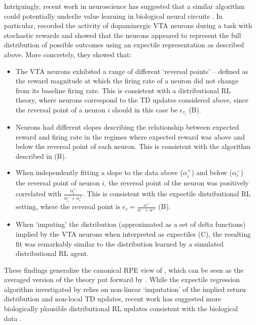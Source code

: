 Intriguingly, recent work in neuroscience has suggested that a similar algorithm could potentially underlie value learning in biological neural circuits \citep{dabney2020distributional,lowet2020distributional}.
In particular, \citet{dabney2020distributional} recorded the activity of dopaminergic VTA neurons during a task with stochastic rewards and showed that the neurons appeared to represent the full distribution of possible outcomes using an expectile representation as described above.
More concretely, they showed that:
\begin{itemize}
    \item The VTA neurons exhibited a range of different `reversal points' -- defined as the reward magnitude at which the firing rate of a neuron did not change from its baseline firing rate.
    This is consistent with a distributional RL theory, where neurons correspond to the TD updates considered above, since the reversal point of a neuron $i$ should in this case be $\epsilon_{\tau_i}$ (B).
    \item Neurons had different slopes describing the relationship between expected reward and firing rate in the regimes where expected reward was above and below the reversal point of each neuron.
    This is consistent with the algorithm described in  (B).
    \item When independently fitting a slope to the data above ($\alpha_i^+$) and below ($\alpha_i^-$) the reversal point of neuron $i$, the reversal point of the neuron was positively correlated with $\frac{\alpha_i^{+}}{\alpha_i^- + \alpha_i^+}$.
    This is consistent with the expectile distributional RL setting, where the reversal point is $\epsilon_\tau = \frac{\alpha^{+}}{\alpha^- + \alpha^+}$ (B).
    \item When `imputing' the distribution (approximated as a set of delta functions) implied by the VTA neurons when interpreted as expectiles (C), the resulting fit was remarkably similar to the distribution learned by a simulated distributional RL agent.
\end{itemize}
These findings generalize the canonical RPE view of \citet{schultz1997neural}, which can be seen as the averaged version of the theory put forward by \citet{dabney2020distributional}.
While the expectile regression algorithm investigated by \citet{dabney2020distributional} relies on non-linear `imputation' of the implied return distribution and non-local TD updates, recent work has suggested more biologically plausible distributional RL updates consistent with the biological data \citep{tano2020local}.
